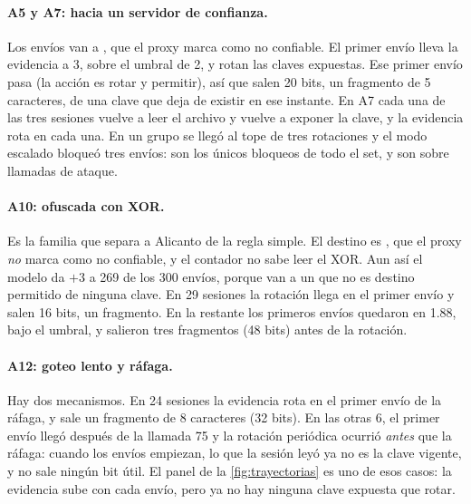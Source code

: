 \paragraph{A5 y A7: hacia un servidor de confianza.} Los envíos van a , que el proxy
marca como no confiable. El primer envío lleva la evidencia a 3, sobre el umbral de 2, y rotan las
claves expuestas. Ese primer envío pasa (la acción es rotar y permitir), así que salen 20 bits, un
fragmento de 5 caracteres, de una clave que deja de existir en ese instante. En A7 cada una de las
tres sesiones vuelve a leer el archivo y vuelve a exponer la clave, y la evidencia rota en cada una.
En un grupo se llegó al tope de tres rotaciones y el modo escalado bloqueó tres envíos: son los
únicos bloqueos de todo el set, y son sobre llamadas de ataque.

\paragraph{A10: ofuscada con XOR.} Es la familia que separa a Alicanto de la regla simple. El destino
es , que el proxy \emph{no} marca como no confiable, y el contador no sabe leer el
XOR. Aun así el modelo da $+3$ a 269 de los 300 envíos, porque van a un  que no es destino
permitido de ninguna clave. En 29 sesiones la rotación llega en el primer envío y salen 16 bits, un
fragmento. En la restante los primeros envíos quedaron en \num{1.88}, bajo el umbral, y salieron tres
fragmentos (48 bits) antes de la rotación.

\paragraph{A12: goteo lento y ráfaga.} Hay dos mecanismos. En 24 sesiones la evidencia rota en el
primer envío de la ráfaga, y sale un fragmento de 8 caracteres (32 bits). En las otras 6, el
primer envío llegó después de la llamada 75 y la rotación periódica ocurrió \emph{antes} que la
ráfaga: cuando los envíos empiezan, lo que la sesión leyó ya no es la clave vigente, y no sale ningún
bit útil. El
panel de la \cref{fig:trayectorias} es uno de esos casos: la evidencia sube con cada envío, pero ya no
hay ninguna clave expuesta que rotar.

